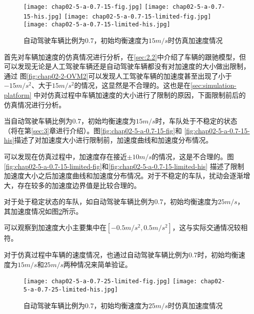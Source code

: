 \begin{figure}
  \centering
    {\texttt{[image: chap02-5-a-0.7-15-fig.jpg]}}
    {\texttt{[image: chap02-5-a-0.7-15-his.jpg]}}
    {\texttt{[image: chap02-5-a-0.7-15-limited-fig.jpg]}}
    {\texttt{[image: chap02-5-a-0.7-15-limited-his.jpg]}}
  \caption{自动驾驶车辆比例为$0.7$，初始均衡速度为$15m/s$时仿真加速度情况}
  \label{fig:chap02-5-a}
\end{figure}

首先对车辆加速度的仿真情况进行分析，在\ref{sec:2.2}中介绍了车辆的跟驰模型，但可以发现无论是人工驾驶车辆还是自动驾驶车辆都没有对加速度的大小做出限制，通过
图\ref{fig:chap02-2-OVM2}可以发现人工驾驶车辆的加速度甚至出现了小于$-15m/s^2$、大于$15m/s^2$的情况，这显然是不合理的。这也是在\ref{sec:simulation-platform}
中对仿真过程中车辆加速度的大小进行了限制的原因，下面限制前后的仿真情况进行分析。

当自动驾驶车辆比例为$0.7$，初始均衡速度为$15m/s$时，车队处于不稳定的状态（将在第\ref{sec:3}章进行介绍）。图\ref{fig:chap02-5-a-0.7-15-fig}和
\ref{fig:chap02-5-a-0.7-15-his}描述了对加速度大小进行限制前，加速度曲线和加速度分布情况。

可以发现在仿真过程中，加速度存在接近$\pm 10m/s$的情况，这是不合理的。图\ref{fig:chap02-5-a-0.7-15-limited-fig}和\ref{fig:chap02-5-a-0.7-15-limited-his}
描述了限制加速度大小之后加速度曲线和加速度分布情况。对于不稳定的车队，扰动会逐渐增大，存在较多的加速度边界值是比较合理的。

对于处于稳定状态的车队，如自动驾驶车辆比例为$0.7$，初始均衡速度为$25m/s$，其加速度情况如图\ref{fig:chap02-6}所示。

可以观察到加速度大小主要集中在$[-0.5m/s^2, 0.5m/s^2]$，这与实际交通情况较相符。

对于仿真过程中车辆的速度情况，也通过自动驾驶车辆比例为$0.7$时，初始均衡速度为$15m/s$和$25m/s$两种情况来简单验证。

\begin{figure}
  \centering
    {\texttt{[image: chap02-5-a-0.7-25-limited-fig.jpg]}}
    {\texttt{[image: chap02-5-a-0.7-25-limited-his.jpg]}}
  \caption{自动驾驶车辆比例为$0.7$，初始均衡速度为$25m/s$时仿真加速度情况}
  \label{fig:chap02-6}
\end{figure}

